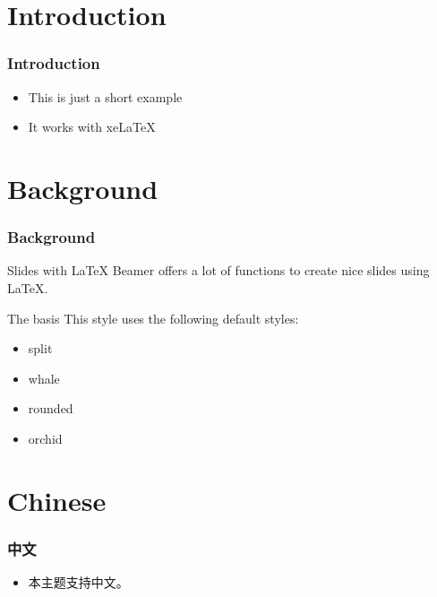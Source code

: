 \frame[plain]{\titlepage}

\section{Introduction}

\begin{frame}
  \frametitle{Introduction}

  \begin{itemize}
  \item<1-> This is just a short example
  \item<2-> It works with xeLaTeX
  \end{itemize}
\end{frame}

\section{Background}

\begin{frame}
  \frametitle{Background}

  \begin{block}{Slides with \LaTeX}
    Beamer offers a lot of functions to create nice slides using \LaTeX.
  \end{block}

  \begin{block}{The basis}
    This style uses the following default styles:
    \begin{itemize}
    \item split
    \item whale
    \item rounded
    \item orchid
    \end{itemize}
  \end{block}
\end{frame}

\section{Chinese}

\begin{frame}
  \frametitle{中文}

  \begin{itemize}
  \item 本主题支持中文。
  \end{itemize}
\end{frame}

